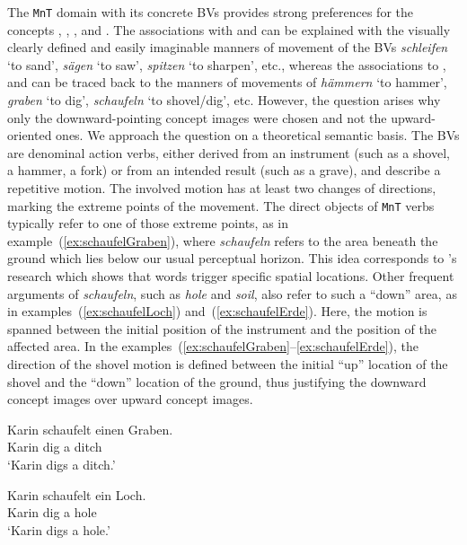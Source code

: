 \documentclass[output=paper]{langsci/langscibook}
\begin{document}
The \texttt{MnT} domain with its concrete BVs provides strong
preferences for the concepts ,
, ,  and
. The associations with  and
 can be explained with the visually clearly defined
and easily imaginable manners of movement of the BVs
\textit{schleifen} `to sand', \textit{sägen} `to saw',
\textit{spitzen} `to sharpen', etc., whereas the associations to
,  and  can
be traced back to the manners of movements of \textit{hämmern} `to
hammer', \textit{graben} `to dig', \textit{schaufeln} `to
shovel/dig', etc. However, the question arises why only the
downward-pointing concept images were chosen and not the upward-oriented ones. We
approach the question on a theoretical semantic basis. The BVs are
denominal action verbs, either derived from an instrument (such as a
shovel, a hammer, a fork) or from an intended result (such as a
grave), and describe a repetitive motion. The involved motion has at
least two changes of directions, marking the extreme points of the
movement. The direct objects of \texttt{MnT} verbs typically refer to
one of those extreme points, as in example~(\ref{ex:schaufelGraben}),
where \textit{schaufeln} refers to the area beneath the ground which
lies below our usual perceptual horizon. This idea corresponds to
\cite{LachmairEtAl:16}'s research which shows that words trigger
specific spatial locations. Other frequent arguments of
\textit{schaufeln}, such as \textit{hole} and \textit{soil}, also
refer to such a ``down'' area, as in examples~(\ref{ex:schaufelLoch})
and~(\ref{ex:schaufelErde}). Here, the motion is spanned between the
initial position of the instrument and the position of the affected
area. In the
examples~(\ref{ex:schaufelGraben}--\ref{ex:schaufelErde}), the
direction of the shovel motion is defined between the initial ``up''
location of the shovel and the ``down'' location of the ground, thus
justifying the downward concept images over upward concept images.

\ea\label{ex:schaufelGraben} 
\gll Karin schaufelt einen Graben.\\ 
Karin dig a ditch\\
\glt `Karin digs a ditch.'
\z 

\ea\label{ex:schaufelLoch} 
\gll Karin schaufelt ein Loch.\\ 
Karin dig a hole\\
\glt `Karin digs a hole.'
\z  
\end{document}

